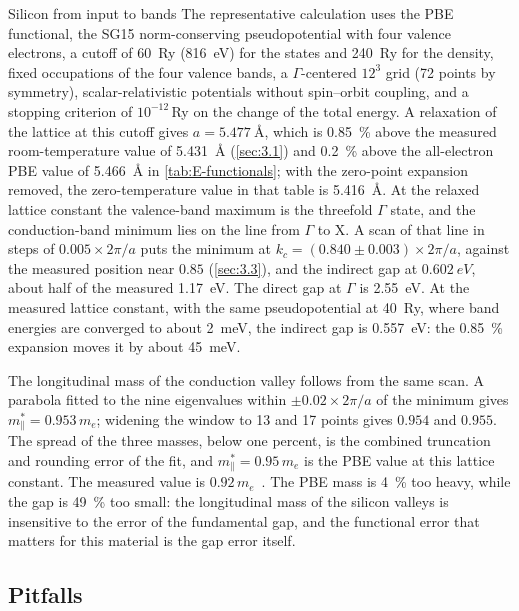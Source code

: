 \begin{workedexample}{Silicon from input to bands}\label{we:E-si-bands}
The representative calculation uses the PBE functional, the SG15 norm-conserving pseudopotential with four valence electrons, a cutoff of \SI{60}{Ry} (\SI{816}{eV}) for the states and \SI{240}{Ry} for the density, fixed occupations of the four valence bands, a $\Gamma$-centered $12^3$ grid (72 points by symmetry), scalar-relativistic potentials without spin--orbit coupling, and a stopping criterion of $10^{-12}$\,Ry on the change of the total energy. A relaxation of the lattice at this cutoff gives $a = \SI{5.477}{\angstrom}$, which is \SI{0.85}{\percent} above the measured room-temperature value of \SI{5.431}{\angstrom} (\cref{sec:3.1}) and \SI{0.2}{\percent} above the all-electron PBE value of \SI{5.466}{\angstrom} in \cref{tab:E-functionals}; with the zero-point expansion removed, the zero-temperature value in that table is \SI{5.416}{\angstrom}. At the relaxed lattice constant the valence-band maximum is the threefold $\Gamma$ state, and the conduction-band minimum lies on the line from $\Gamma$ to X. A scan of that line in steps of $0.005\times2\pi/a$ puts the minimum at $k_c = (0.840 \pm 0.003)\times2\pi/a$, against the measured position near $0.85$ (\cref{sec:3.3}), and the indirect gap at $\SI{0.602}{eV}$, about half of the measured \SI{1.17}{eV}. The direct gap at $\Gamma$ is \SI{2.55}{eV}. At the measured lattice constant, with the same pseudopotential at \SI{40}{Ry}, where band energies are converged to about \SI{2}{meV}, the indirect gap is \SI{0.557}{eV}: the \SI{0.85}{\percent} expansion moves it by about \SI{45}{meV}.

The longitudinal mass of the conduction valley follows from the same scan. A parabola fitted to the nine eigenvalues within $\pm0.02\times2\pi/a$ of the minimum gives $m^*_\parallel = 0.953\,m_e$; widening the window to 13 and 17 points gives $0.954$ and $0.955$. The spread of the three masses, below one percent, is the combined truncation and rounding error of the fit, and $m^*_\parallel = 0.95\,m_e$ is the PBE value at this lattice constant. The measured value is $0.92\,m_e$~\cite{hensel1965cyclotron}. The PBE mass is \SI{4}{\percent} too heavy, while the gap is \SI{49}{\percent} too small: the longitudinal mass of the silicon valleys is insensitive to the error of the fundamental gap, and the functional error that matters for this material is the gap error itself.
\end{workedexample}

\subsection{Pitfalls}

